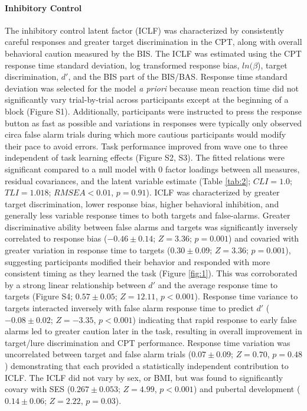 \documentclass[utf8]{stylesheet}
\begin{document}
\paragraph{Inhibitory Control} 
The inhibitory control latent factor (ICLF) was characterized by consistently careful responses and greater target discrimination in the CPT, along with overall behavioral caution measured by the BIS. The ICLF  was estimated using the CPT response time standard deviation, log transformed response bias, $ln(\beta$), target discrimination, $d'$, and the BIS part of the BIS/BAS. Response time standard deviation was selected for the model \textit{a priori} because mean reaction time did not significantly vary trial-by-trial across participants except at the beginning of a block (Figure S1). Additionally, participants were instructed to press the response button as fast as possible and variations in responses were typically only observed circa false alarm trials during which more cautious participants would modify their pace to avoid errors. Task performance improved from wave one to three independent of task learning effects (Figure S2, S3). The fitted relations were significant compared to a null model with 0 factor loadings between all measures, residual covariances, and the latent variable estimate (Table \ref{tab:2}; $CLI = 1.0$; $TLI = 1.018$; $RMSEA < 0.01$, $p = 0.91$). ICLF was characterized by greater target discrimination, lower response bias, higher behavioral inhibition, and generally less variable response times to both targets and false-alarms. Greater discriminative ability between false alarms and targets was significantly inversely correlated to response bias ($-0.46\pm0.14$; $Z=3.36$; $p=0.001$) and covaried with greater variation in response time to targets ($0.30\pm0.09$; $Z=3.36$; $p=0.001$), suggesting participants modified their behavior and responded with more consistent timing as they learned the task (Figure \ref{fig:1}). This was corroborated by a strong linear relationship between $d'$ and the average response time to targets (Figure S4; $0.57\pm0.05$; $Z=12.11$, $p<0.001$). Response time variance to targets interacted inversely with false alarm response time to predict $d'$ ($-0.08\pm0.02$;  $Z=-3.35$, $p < 0.001$) indicating that rapid response to early false alarms led to greater caution later in the task, resulting in overall improvement in target/lure discrimination and CPT performance. Response time variation was uncorrelated between target and false alarm trials ($0.07\pm0.09$; $Z=0.70$, $p=0.48$) demonstrating that each provided a statistically independent contribution to ICLF. The ICLF did not vary by sex, or BMI, but was found to significantly covary with SES ($0.267\pm0.053$; $Z=4.99$, $p<0.001$) and pubertal development ($0.14\pm0.06$; $Z=2.22$, $p=0.03$). 
\end{document}
